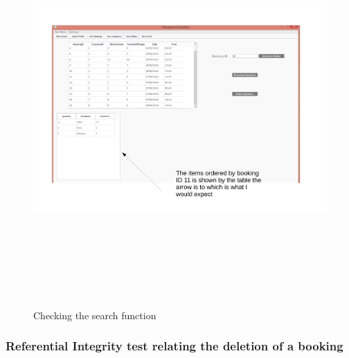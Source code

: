 \begin{landscape}
\begin{figure}[H]
    \includegraphics[height = 15cm]{./Testing/images/booking11.pdf}
    \caption{Checking the search function} \label{fig:searchFunction}
\end{figure}

\subsubsection{Referential Integrity test relating the deletion of a booking}


\end{landscape}

